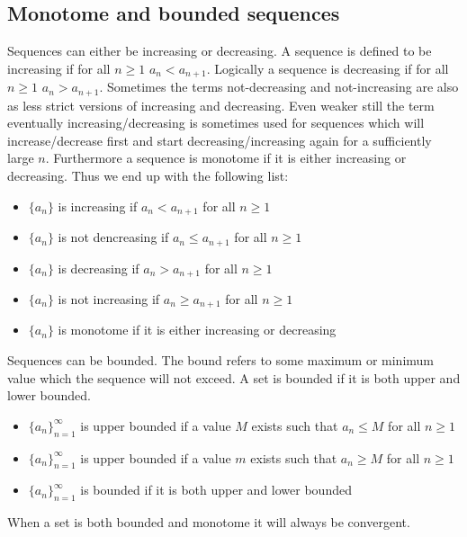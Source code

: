 \documentclass[11pt, a4paper]{article}
\begin{document}
\subsection{Monotome and bounded sequences}
Sequences can either be increasing or decreasing. A sequence is defined to be increasing if for all $n \geq 1$ $a_n < a_{n+1}$. Logically a sequence is decreasing if for all $n \geq 1$ $a_n > a_{n+1}$. Sometimes the terms not-decreasing and not-increasing are also as less strict versions of increasing and decreasing. Even weaker still the term eventually increasing/decreasing is sometimes used for sequences which will increase/decrease first and start decreasing/increasing again for a sufficiently large $n$. Furthermore a sequence is monotome if it is either increasing or decreasing. Thus we end up with the following list:
\begin{itemize}
  \item $\{ a_n \}$ is increasing if $a_n < a_{n+1}$ for all $n \geq 1$
  \item $\{ a_n \}$ is not dencreasing if $a_n \leq a_{n+1}$ for all $n \geq 1$
  \item $\{ a_n \}$ is decreasing if $a_n > a_{n+1}$ for all $n \geq 1$
  \item $\{ a_n \}$ is not increasing if $a_n \geq a_{n+1}$ for all $n \geq 1$
  \item $\{ a_n \}$ is monotome if it is either increasing or decreasing
\end{itemize}
Sequences can be bounded. The bound refers to some maximum or minimum value which the sequence will not exceed. A set is bounded if it is both upper and lower bounded.
\begin{itemize}
  \item $\{ a_n\}_{n=1}^\infty$ is upper bounded if a value $M$ exists such that $a_n \leq M$ for all $n\geq 1$
  \item $\{ a_n\}_{n=1}^\infty$ is upper bounded if a value $m$ exists such that $a_n \geq M$ for all $n\geq 1$
  \item $\{ a_n\}_{n=1}^\infty$ is bounded if it is both upper and lower bounded
\end{itemize}
When a set is both bounded and monotome it will always be convergent.
\end{document}
